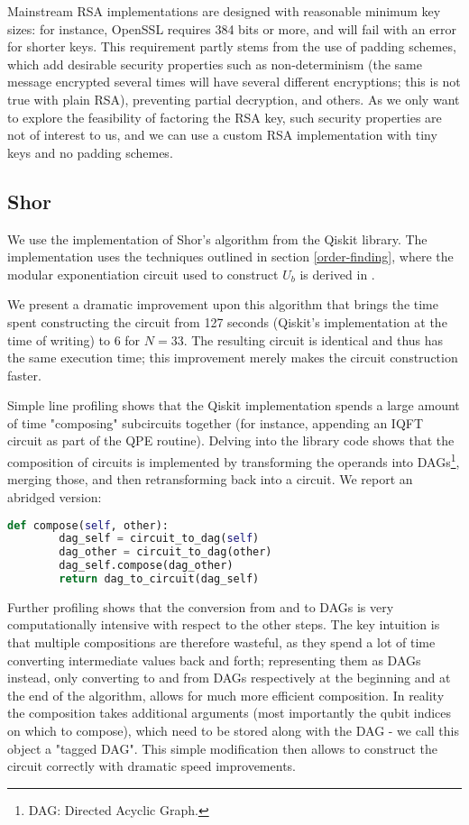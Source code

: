 \documentclass[conference]{IEEEtran}
\begin{document}
Mainstream RSA implementations are designed with reasonable minimum key sizes: for instance, OpenSSL requires 384 bits or more, and will fail with an error for shorter keys. This requirement partly stems from the use of padding schemes, which add desirable security properties such as non-determinism (the same message encrypted several times will have several different encryptions; this is not true with plain RSA), preventing partial decryption, and others. As we only want to explore the feasibility of factoring the RSA key, such security properties are not of interest to us, and we can use a custom RSA implementation with tiny keys and no padding schemes.

\subsection{Shor}
We use the implementation of Shor's algorithm from the Qiskit library. The implementation uses the techniques outlined in section \ref{order-finding}, where the modular exponentiation circuit used to construct $U_b$ is derived in \cite{vbe}.

We present a dramatic improvement upon this algorithm that brings the time spent constructing the circuit from 127 seconds (Qiskit's implementation at the time of writing) to 6 for $N=33$. The resulting circuit is identical and thus has the same execution time; this improvement merely makes the circuit construction faster.

Simple line profiling shows that the Qiskit implementation spends a large amount of time "composing" subcircuits together (for instance, appending an IQFT circuit as part of the QPE routine). Delving into the library code shows that the composition of circuits is implemented by transforming the operands into DAGs\footnote{DAG: Directed Acyclic Graph.}, merging those, and then retransforming back into a circuit. We report an abridged version:

\lstset{basicstyle=\ttfamily\footnotesize,breaklines=true}
\begin{lstlisting}[language=Python]
def compose(self, other):
        dag_self = circuit_to_dag(self)
        dag_other = circuit_to_dag(other)
        dag_self.compose(dag_other)
        return dag_to_circuit(dag_self)
\end{lstlisting}

Further profiling shows that the conversion from and to DAGs is very computationally intensive with respect to the other steps. The key intuition is that multiple compositions are therefore wasteful, as they spend a lot of time converting intermediate values back and forth; representing them as DAGs instead, only converting to and from DAGs respectively at the beginning and at the end of the algorithm, allows for much more efficient composition. In reality the composition takes additional arguments (most importantly the qubit indices on which to compose), which need to be stored along with the DAG - we call this object a "tagged DAG". This simple modification then allows to construct the circuit correctly with dramatic speed improvements.
\end{document}
